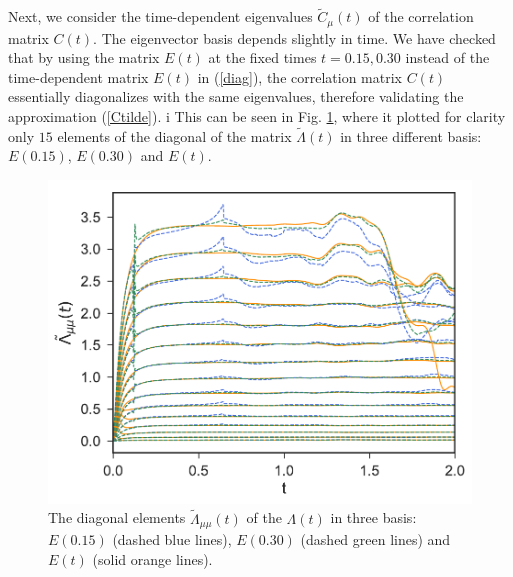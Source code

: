 \documentclass[a4paper,openright,12pt]{book}
\begin{document}
Next, we consider the time-dependent eigenvalues $\tilde{C}_\mu(t)$ of
the correlation matrix $C(t)$.  The eigenvector basis depends slightly
in time. We have checked that by  using the matrix $E(t)$ at the fixed
times  $t=0.15,0.30$  instead  of  the  time-dependent  matrix  $E(t)$  in
(\ref{diag}), the  correlation matrix $C(t)$  essentially diagonalizes
with  the same  eigenvalues,  therefore  validating the  approximation
(\ref{Ctilde}). i
This can be seen in Fig. \ref{fig:LambdatBasis-WALLS-66nodes}, 
where it plotted for clarity only $15$ elements of the diagonal of the matrix $\tilde{\Lambda}(t)$ in three different basis: 
$E(0.15)$, $E(0.30)$ and $E(t)$. 
\begin{figure}[h!]
  \centering
\includegraphics[scale=0.45]{LambdatBasis-WALLS-66nodes}
\caption[Diagonal elements  $\tilde{\Lambda}_{\mu\mu}(t)$ of $\Lambda(t)$ in three different basis - 66nodes.]{The  diagonal elements  $\tilde{\Lambda}_{\mu\mu}(t)$ of  the
  $\Lambda(t)$ in three basis:
$E(0.15)$ (dashed blue lines), $E(0.30)$ (dashed green lines) and $E(t)$ (solid orange lines). }
\label{fig:LambdatBasis-WALLS-66nodes}
\end{figure}
\end{document}
